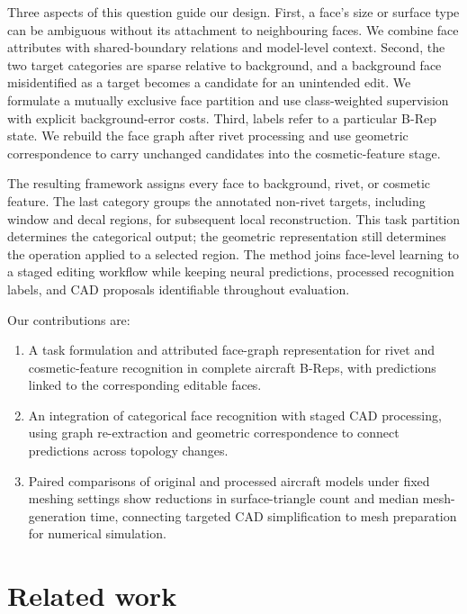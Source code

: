 \documentclass[12pt,a4paper]{article}
\begin{document}
Three aspects of this question guide our design. First, a face's size or surface type can be ambiguous without its attachment to neighbouring faces. We combine face attributes with shared-boundary relations and model-level context. Second, the two target categories are sparse relative to background, and a background face misidentified as a target becomes a candidate for an unintended edit. We formulate a mutually exclusive face partition and use class-weighted supervision with explicit background-error costs. Third, labels refer to a particular B-Rep state. We rebuild the face graph after rivet processing and use geometric correspondence to carry unchanged candidates into the cosmetic-feature stage.

The resulting framework assigns every face to background, rivet, or cosmetic feature. The last category groups the annotated non-rivet targets, including window and decal regions, for subsequent local reconstruction. This task partition determines the categorical output; the geometric representation still determines the operation applied to a selected region. The method joins face-level learning to a staged editing workflow while keeping neural predictions, processed recognition labels, and CAD proposals identifiable throughout evaluation.

Our contributions are:
\begin{enumerate}[label=(\arabic*)]
  \item A task formulation and attributed face-graph representation for rivet and cosmetic-feature recognition in complete aircraft B-Reps, with predictions linked to the corresponding editable faces.
  \item An integration of categorical face recognition with staged CAD processing, using graph re-extraction and geometric correspondence to connect predictions across topology changes.
  \item Paired comparisons of original and processed aircraft models under fixed meshing settings show reductions in surface-triangle count and median mesh-generation time, connecting targeted CAD simplification to mesh preparation for numerical simulation.
\end{enumerate}

\section{Related work}\label{sec2}
\end{document}
